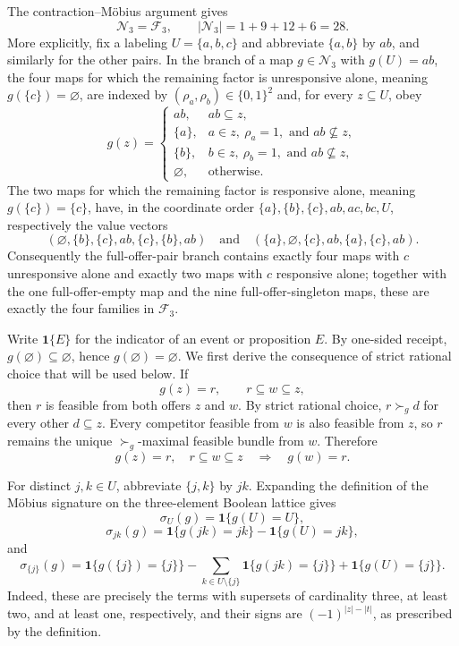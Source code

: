The contraction--Möbius argument gives
\[
\mathcal N_3=\mathcal F_3,
\qquad
|\mathcal N_3|=1+9+12+6=28.
\]
More explicitly, fix a labeling \(U=\{a,b,c\}\) and abbreviate
\(\{a,b\}\) by \(ab\), and similarly for the other pairs.  In the
branch of a map \(g\in\mathcal N_3\) with \(g(U)=ab\), the four maps for which the remaining factor is
unresponsive alone, meaning \(g(\{c\})=\varnothing\), are indexed by
\((\rho_a,\rho_b)\in\{0,1\}^2\) and, for every \(z\subseteq U\), obey
\[
g(z)=
\begin{cases}
ab,&ab\subseteq z,\\
\{a\},&a\in z,\ \rho_a=1,\text{ and }ab\nsubseteq z,\\
\{b\},&b\in z,\ \rho_b=1,\text{ and }ab\nsubseteq z,\\
\varnothing,&\text{otherwise}.
\end{cases}
\]
The two maps for which the remaining factor is responsive alone,
meaning \(g(\{c\})=\{c\}\), have, in the coordinate order
\(\{a\},\{b\},\{c\},ab,ac,bc,U\), respectively the value vectors
\[
(\varnothing,\{b\},\{c\},ab,\{c\},\{b\},ab)
\quad\text{and}\quad
(\{a\},\varnothing,\{c\},ab,\{a\},\{c\},ab).
\]
Consequently the full-offer-pair branch contains exactly four maps
with \(c\) unresponsive alone and exactly two maps with \(c\)
responsive alone; together with the one full-offer-empty map and the
nine full-offer-singleton maps, these are exactly the four families in
\(\mathcal F_3\).

Write \(\mathbf 1\{E\}\) for the indicator of an event or proposition
\(E\).  By one-sided receipt,
\(g(\varnothing)\subseteq\varnothing\), hence
\(g(\varnothing)=\varnothing\).  We first derive the consequence of
strict rational choice that will be used below.  If
\[
g(z)=r,
\qquad
r\subseteq w\subseteq z,
\]
then \(r\) is feasible from both offers \(z\) and \(w\).  By strict
rational choice, \(r\succ_g d\) for every other \(d\subseteq z\).
Every competitor feasible from \(w\) is also feasible from \(z\), so
\(r\) remains the unique \(\succ_g\)-maximal feasible bundle from
\(w\).  Therefore
\[
g(z)=r,\quad r\subseteq w\subseteq z
\quad\Longrightarrow\quad
g(w)=r. \tag{1}
\]

For distinct \(j,k\in U\), abbreviate \(\{j,k\}\) by \(jk\).
Expanding the definition of the Möbius signature on the three-element
Boolean lattice gives
\[
\sigma_U(g)=\mathbf 1\{g(U)=U\}, \tag{2}
\]
\[
\sigma_{jk}(g)
=\mathbf 1\{g(jk)=jk\}-\mathbf 1\{g(U)=jk\}, \tag{3}
\]
and
\[
\sigma_{\{j\}}(g)
=\mathbf 1\{g(\{j\})=\{j\}\}
-\sum_{k\in U\setminus\{j\}}
 \mathbf 1\{g(jk)=\{j\}\}
+\mathbf 1\{g(U)=\{j\}\}. \tag{4}
\]
Indeed, these are precisely the terms with supersets of cardinality
three, at least two, and at least one, respectively, and their signs
are \((-1)^{|z|-|t|}\), as prescribed by the definition.

